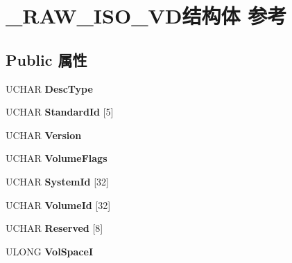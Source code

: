 \hypertarget{struct___r_a_w___i_s_o___v_d}{}\section{\+\_\+\+R\+A\+W\+\_\+\+I\+S\+O\+\_\+\+V\+D结构体 参考}
\label{struct___r_a_w___i_s_o___v_d}
\subsection*{Public 属性}
\begin{DoxyCompactItemize}
\item 
\mbox{\label{struct___r_a_w___i_s_o___v_d_a098b382168c7dc73adeb5689051aa54c}} 
U\+C\+H\+AR {\bfseries Desc\+Type}
\item 
\mbox{\label{struct___r_a_w___i_s_o___v_d_ab8e7a676e8c2d8ba0d6d68f2a2b4c90c}} 
U\+C\+H\+AR {\bfseries Standard\+Id} \mbox{[}5\mbox{]}
\item 
\mbox{\label{struct___r_a_w___i_s_o___v_d_ad801876612e710e0e14aab9974da85cf}} 
U\+C\+H\+AR {\bfseries Version}
\item 
\mbox{\label{struct___r_a_w___i_s_o___v_d_af17fb5ae2d2e51f3578ca5dabfe23d10}} 
U\+C\+H\+AR {\bfseries Volume\+Flags}
\item 
\mbox{\label{struct___r_a_w___i_s_o___v_d_af8401a469dbb8f7caad2965e6570de97}} 
U\+C\+H\+AR {\bfseries System\+Id} \mbox{[}32\mbox{]}
\item 
\mbox{\label{struct___r_a_w___i_s_o___v_d_a64dee7ac5d790cf40a3ae610feb803cc}} 
U\+C\+H\+AR {\bfseries Volume\+Id} \mbox{[}32\mbox{]}
\item 
\mbox{\label{struct___r_a_w___i_s_o___v_d_a75b51b566f7daf1d349cb120c15a6057}} 
U\+C\+H\+AR {\bfseries Reserved} \mbox{[}8\mbox{]}
\item 
\mbox{\label{struct___r_a_w___i_s_o___v_d_a014e26b2e71b5e1ab7ae6565a8f66efe}} 
U\+L\+O\+NG {\bfseries Vol\+SpaceI}

\end{DoxyCompactItemize}
